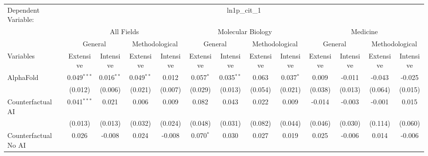 \begingroup
\centering
\begin{tabular}{lcccccccccccc}
   \tabularnewline \midrule \midrule
   Dependent Variable: & \multicolumn{12}{c}{ln1p\_cit\_1}\\
 & \multicolumn{4}{c}{All Fields} & \multicolumn{4}{c}{Molecular Biology} & \multicolumn{4}{c}{Medicine} \\
\cmidrule(lr){2-5} \cmidrule(lr){6-9} \cmidrule(lr){10-13}
 & \multicolumn{2}{c}{General} & \multicolumn{2}{c}{Methodological} & \multicolumn{2}{c}{General} & \multicolumn{2}{c}{Methodological} & \multicolumn{2}{c}{General} & \multicolumn{2}{c}{Methodological} \\
\cmidrule(lr){2-3} \cmidrule(lr){4-5} \cmidrule(lr){6-7} \cmidrule(lr){8-9} \cmidrule(lr){10-11} \cmidrule(lr){12-13}
Variables & \multicolumn{1}{c}{Extensive} & \multicolumn{1}{c}{Intensive} & \multicolumn{1}{c}{Extensive} & \multicolumn{1}{c}{Intensive} & \multicolumn{1}{c}{Extensive} & \multicolumn{1}{c}{Intensive} & \multicolumn{1}{c}{Extensive} & \multicolumn{1}{c}{Intensive} & \multicolumn{1}{c}{Extensive} & \multicolumn{1}{c}{Intensive} & \multicolumn{1}{c}{Extensive} & \multicolumn{1}{c}{Intensive} \\
\cmidrule(lr){1-1}\cmidrule(lr){2-2} \cmidrule(lr){3-3} \cmidrule(lr){4-4} \cmidrule(lr){5-5} \cmidrule(lr){6-6} \cmidrule(lr){7-7} \cmidrule(lr){8-8} \cmidrule(lr){9-9} \cmidrule(lr){10-10} \cmidrule(lr){11-11} \cmidrule(lr){12-12} \cmidrule(lr){13-13}
   AlphaFold                                & 0.049$^{***}$  & 0.016$^{**}$ & 0.049$^{**}$ & 0.012   & 0.057$^{*}$    & 0.035$^{**}$ & 0.063        & 0.037$^{*}$ & 0.009   & -0.011  & -0.043  & -0.025\\   
                                            & (0.012)        & (0.006)      & (0.021)      & (0.007) & (0.029)        & (0.013)      & (0.054)      & (0.021)     & (0.038) & (0.013) & (0.064) & (0.015)\\   
   Counterfactual AI                        & 0.041$^{***}$  & 0.021        & 0.006        & 0.009   & 0.082          & 0.043        & 0.022        & 0.009       & -0.014  & -0.003  & -0.001  & 0.015\\   
                                            & (0.013)        & (0.013)      & (0.032)      & (0.024) & (0.048)        & (0.031)      & (0.082)      & (0.044)     & (0.046) & (0.030) & (0.114) & (0.060)\\   
   Counterfactual No AI                     & 0.026          & -0.008       & 0.024        & -0.008  & 0.070$^{*}$    & 0.030        & 0.027        & 0.019       & 0.025   & -0.006  & 0.014   & -0.006\\   

\end{tabular}
